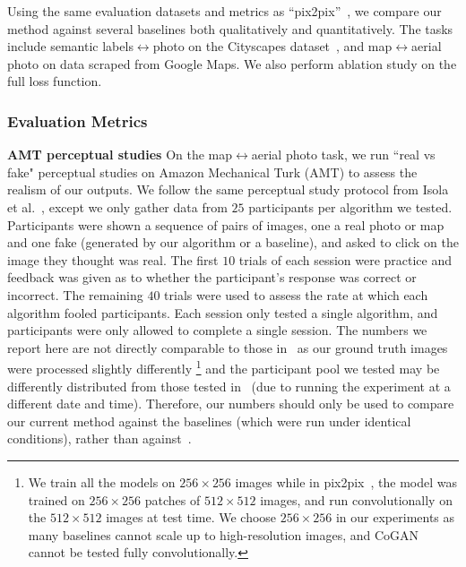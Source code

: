 Using the same evaluation datasets and metrics as ``pix2pix''~, we compare our method against several baselines both qualitatively and quantitatively. The tasks include semantic labels$\leftrightarrow$photo on the Cityscapes dataset~\cite{Cordts2016Cityscapes}, and map$\leftrightarrow$aerial photo on data scraped from Google Maps. We also perform ablation study on the full loss function.
	
\vspace{-1 mm}
\subsubsection{Evaluation Metrics}
\vspace{-1 mm}

\hspace{4mm} {\bf AMT perceptual studies} On the map$\leftrightarrow$aerial photo task, we run ``real vs fake" perceptual studies on Amazon Mechanical Turk (AMT) to assess the realism of our outputs. We follow the same perceptual study protocol from Isola et al.~, except we only gather data from $25$ participants per algorithm we tested. Participants were shown a sequence of pairs of images, one a real photo or map and one fake (generated by our algorithm or a baseline), and asked to click on the image they thought was real. The first $10$ trials of each session were practice and feedback was given as to whether the participant's response was correct or incorrect. The remaining $40$ trials were used to assess the rate at which each algorithm fooled participants. Each session only tested a single algorithm, and participants were only allowed to complete a single session. The numbers we report here are not directly comparable to those in~\cite{isola2016image} as our ground truth images were processed slightly differently
\footnote{We train all the models on $256\times256$ images while in pix2pix~\cite{isola2016image}, the model was trained on $256\times256$ patches of $512\times512$ images, and run convolutionally on the $512\times512$ images at test time. We choose $256\times256$ in our experiments as many baselines cannot scale up to high-resolution images, and CoGAN cannot be tested fully convolutionally.} and the participant pool we tested may be differently distributed from those tested in~\cite{isola2016image} (due to running the experiment at a different date and time). Therefore, our numbers should only be used to compare our current method against the baselines (which were run under identical conditions), rather than against~\cite{isola2016image}. 

